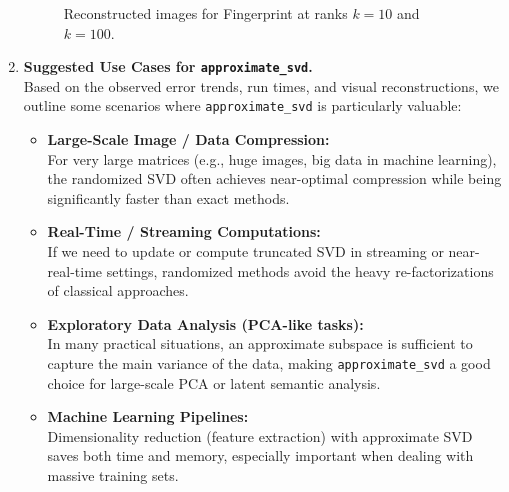 \documentclass[11pt,a4paper, margin=1in]{article}
\begin{document}
\begin{enumerate}
\begin{figure}[H]
      \caption{Reconstructed images for Fingerprint at ranks $k=10$ and $k=100$.}

    \end{figure}

    \newpage

    \item \textbf{Suggested Use Cases for \texttt{approximate\_svd}.}\\
    Based on the observed error trends, run times, and visual reconstructions, 
    we outline some scenarios where \texttt{approximate\_svd} is particularly valuable:
    \begin{itemize}
      \item \textbf{Large-Scale Image / Data Compression:} \\
      For very large matrices (e.g., huge images, big data in machine learning), 
      the randomized SVD often achieves near-optimal compression while 
      being significantly faster than exact methods.
      
      \item \textbf{Real-Time / Streaming Computations:} \\
      If we need to update or compute truncated SVD in streaming or near-real-time settings, 
      randomized methods avoid the heavy re-factorizations of classical approaches.
      
      \item \textbf{Exploratory Data Analysis (PCA-like tasks):} \\
      In many practical situations, an approximate subspace is sufficient to capture 
      the main variance of the data, making \texttt{approximate\_svd} a good choice 
      for large-scale PCA or latent semantic analysis.
      
      \item \textbf{Machine Learning Pipelines:} \\
      Dimensionality reduction (feature extraction) with approximate SVD 
      saves both time and memory, especially important when dealing with 
      massive training sets. 
    \end{itemize}

\end{enumerate}
\end{document}
